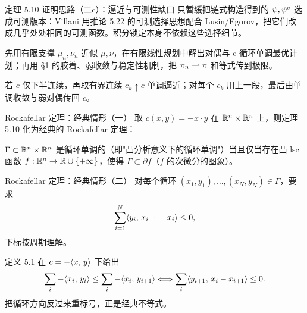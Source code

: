 \begin{frame}{定理 5.10 证明思路（二c）：逼近与可测性缺口}
  只暂缓把链式构造得到的 $\psi,{\psi}^{c}$ 选成可测版本：Villani 用推论 5.22 的可测选择思想配合 Lusin/Egorov，把它们改成几乎处处相同的可测函数。\proofskipnote 积分锁定本身不依赖这些选择细节。

  先用有限支撑 $\mu_n,\nu_n$ 近似 $\mu,\nu$，在有限线性规划中解出对偶与 c-循环单调最优计划；再用 §1 的胶着、弱收敛与稳定性机制，把 $\pi_n\rightharpoonup\pi$ 和等式传到极限。

  若 $c$ 仅下半连续，再取有界连续 $c_k\uparrow c$ 单调逼近；对每个 $c_k$ 用上一段，最后由单调收敛与弱对偶传回 $c$。

\end{frame}

\begin{frame}{Rockafellar 定理：经典情形（一）}
  取 $c(x,y)=-x\cdot y$ 在 $\mathbb{R}^n\times\mathbb{R}^n$ 上，则定理 5.10 化为经典的 Rockafellar 定理：

  $\Gamma\subset\mathbb{R}^n\times\mathbb{R}^n$ 是循环单调的（即"凸分析意义下的循环单调"）当且仅当存在凸 lsc 函数 $f:\mathbb{R}^n\to\mathbb{R}\cup\{+\infty\}$，使得 $\Gamma\subset\partial f$（$f$ 的次微分的图象）。

\end{frame}

\begin{frame}{Rockafellar 定理：经典情形（二）}
  对每个循环 $(x_1,y_1),\ldots,(x_N,y_N)\in\Gamma$，要求
  \[
    \sum_{i=1}^{N}\langle y_i,\,x_{i+1}-x_i\rangle\le0,
  \]
  下标按周期理解。

  定义 5.1 在 $c=-\langle x,\,y\rangle$ 下给出
  \[
    \sum_i-\langle x_i,\,y_i\rangle\le\sum_i-\langle x_i,\,y_{i+1}\rangle
    \Longleftrightarrow
    \sum_i\langle y_{i+1},\,x_i-x_{i+1}\rangle\le0.
  \]
  把循环方向反过来重标号，正是经典不等式。

\end{frame}

